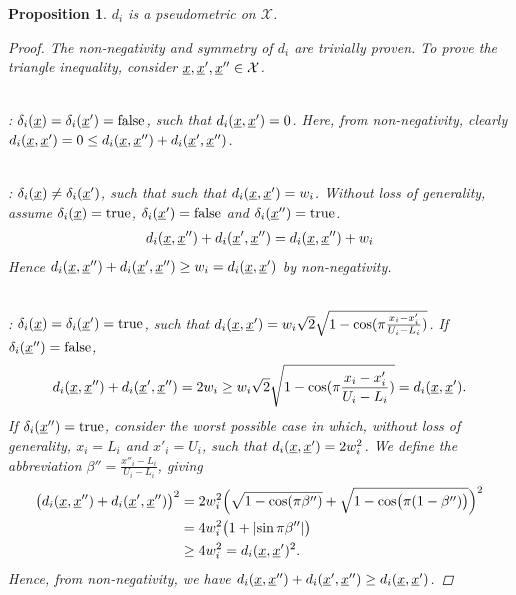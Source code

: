 \documentclass[letterpaper]{article}
\newcommand{\vect}[1]{\underline{\smash{#1}}}
\renewcommand{\v}[1]{\vect{#1}}
\newcommand{\sX}{\mathcal{X}}
\newtheorem{prop}[thm]{Proposition}
\begin{document}
\begin{prop}
  $d_i$ is a pseudometric on $\sX$. 
\begin{proof}
The non-negativity and symmetry of $d_i$ are trivially proven. To prove the triangle inequality, consider $\v{x}, \v{x}', \v{x}'' \in \sX$. 

~\\: $\delta_i(\v{x}) = \delta_i(\v{x}') = \textrm{false}$, such that $d_i(\v{x},\v{x}') = 0$. Here, from non-negativity, clearly $d_i(\v{x},\v{x}') = 0 \leq d_i(\v{x},\v{x}'') + d_i(\v{x}',\v{x}'')$.

~\\: $\delta_i(\v{x}) \neq \delta_i(\v{x}')$, such that such that  $d_i(\v{x},\v{x}') = w_i$.  Without loss of generality, assume $\delta_i(\v{x}) = \text{true}$, $\delta_i(\v{x}') = \text{false}$ and $\delta_i(\v{x}'') = \text{true}$. 
\begin{align}
d_i(\v{x},\v{x}'') + d_i(\v{x}',\v{x}'') = d_i(\v{x},\v{x}'')  + w_i
\end{align}
Hence $d_i(\v{x},\v{x}'') + d_i(\v{x}',\v{x}'') \geq w_i = d_i(\v{x},\v{x}')$ by non-negativity.

~\\: $\delta_i(\v{x}) = \delta_i(\v{x}')=\textrm{true}$, such that  $d_i(\v{x},\v{x}') = w_i \sqrt{2} \sqrt{1 - \cos(\pi \frac{x_i-x_i'}{U_i-L_i})}$.  If  $\delta_i(\v{x}'') = \text{false}$,
\begin{align}
d_i(\v{x},\v{x}'') + d_i(\v{x}',\v{x}'') = 2 w_i \geq w_i \sqrt{2} \sqrt{1 - \cos(\pi \frac{x_i-x_i'}{U_i-L_i})} = d_i(\v{x},\v{x}').
\end{align} 
If  $\delta_i(\v{x}'') = \text{true}$, consider the worst possible case in which, without loss of generality, $x_i=L_i$ and $x'_i=U_i$, such that $d_i(\v{x},\v{x}')=2 w_i^2$.  We define the abbreviation $\beta'' = \frac{x''_i-L_i}{U_i-L_i}$, giving
\begin{align}
\bigl(d_i(\v{x},\v{x}'') + d_i(\v{x}',\v{x}'')\bigr)^2
& = 2w_i^2 \Bigl(\sqrt{1 - \cos (\pi \beta'')} + \sqrt{1 - \cos \bigl(\pi (1-\beta'')\bigr)}\Bigr)^2\nonumber\\
&=4 w_i^2 \bigl(1 + \left|\sin \pi \beta'' \right|\bigr)\nonumber\\
&\geq 4 w_i^2 = d_i(\v{x},\v{x}')^2.
\end{align}
Hence, from non-negativity, we have $d_i(\v{x},\v{x}'') + d_i(\v{x}',\v{x}'')\geq d_i(\v{x},\v{x}')$.
\end{proof}
\end{prop}
\end{document}
